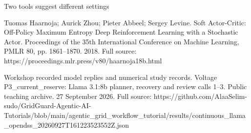 \begin{frame}[t]{Two tools suggest different settings}
{Tuomas Haarnoja; Aurick Zhou; Pieter Abbeel; Sergey Levine. Soft Actor-Critic: Off-Policy Maximum Entropy Deep Reinforcement Learning with a Stochastic Actor. Proceedings of the 35th International Conference on Machine Learning, PMLR 80, pp. 1861--1870. 2018.
Full source: https://proceedi\allowbreak{}ngs.mlr.press/v8\allowbreak{}0/haarnoja18b.ht\allowbreak{}ml

Workshop recorded model replies and numerical study records. Voltage P3\_current\_reserve: Llama 3.1:8b planner, recovery and review calls 1--3. Public teaching archive. 27 September 2026.
Full source: https://github.c\allowbreak{}om/AlaaSelim-sud\allowbreak{}o/GridGuard-Agen\allowbreak{}tic-AI-Tutorials\allowbreak{}/blob/main/agent\allowbreak{}ic\_grid\_workflow\allowbreak{}\_tutorial/result\allowbreak{}s/continuous\_lla\allowbreak{}ma\_opendss\_20260\allowbreak{}927T161223523552\allowbreak{}Z.json}
\end{frame}

